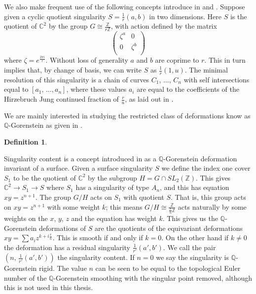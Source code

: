 \documentclass[12pt]{amsbook}
\theoremstyle{plain}
\newtheorem{dfn}[thm]{Definition}
\newcommand{\mb}[1]{\mathbb{#1}}
\newcommand{\ra}{\rightarrow}
\begin{document}
We also make frequent use of the following concepts introduce in \cite{Reid-cyclic} and \cite{SingContent}. Suppose given a cyclic quotient singularity $S=\frac{1}{r}(a,b)$ in two dimensions. Here $S$ is the quotient of $\mb{C}^2$ by the group $G \cong \frac{\mb{Z}}{r\mb{Z}}$, with action defined by the matrix
\[
\left(
\begin{array}{cc}
\zeta^a & 0 \\
0 & \zeta^b \\
\end{array}
\right)
\]
where $\zeta = e^{\frac{2 \pi i}{r}}$. Without loss of generality $a$ and $b$ are coprime to $r$. This in turn implies that, by change of basis, we can write $S$ as $\frac{1}{r}(1,u)$. The minimal resolution of this singularity is a chain of curves $C_1$, $\dots$, $C_n$ with self intersections equal to $[a_1,\, \dots , a_n]$, where these values $a_i$ are equal to the coefficients of the Hirzebruch Jung continued fraction of $\frac{r}{u}$, as laid out in \cite{Reid-cyclic}.


We are mainly interested in studying the restricted class of deformations know as $\mb{Q}$-Gorenstein as given in \cite{Kollar-SB}. 
\begin{dfn}

\end{dfn}
Singularity content is a concept introduced in \cite{SingContent} as a $\mb{Q}$-Gorenstein deformation invariant of a surface. Given a surface singularity $S$ we define the index one cover $S_1$ to be the quotient of $\mb{C}^2$  by the subgroup $H = G \cap SL_2(\mb{Z})$. This gives $\mb{C}^2 \ra S_1 \ra S$ where $S_1$ has a singularity of type $A_n$, and this has equation $xy = z^{n+1}$. The group $G/H$ acts on $S_1$ with quotient $S$. That is, this group acts on $xy = z^{n+1}$ with some weight $k$; this means $G/H \cong \frac{\mb{Z}}{\frac{r}{n}\mb{Z}}$ acts naturally by  some weights on the $x$, $y$, $z$ and the equation has weight $k$. This gives us the $\mb{Q}$-Gorenstein deformations  of $S$ are  the quotients of the equivariant deformations $xy = \sum a_i z^{k + i\frac{r}{n}}$. This is smooth if and only if $k=0$. On the other hand if $k\neq 0$ the deformation has a residual singularity $\frac{1}{r'}(a', b')$. We call the pair $(n, \, \frac{1}{r'}(a', b')) $ the singularity content. If $n=0$ we say the singularity is $\mb{Q}$-Gorenstein rigid. The value $n$ can be seen to be equal to the topological Euler number of the $\mb{Q}$-Gorenstein smoothing with the singular point removed, although this is not used in this thesis.
\end{document}

